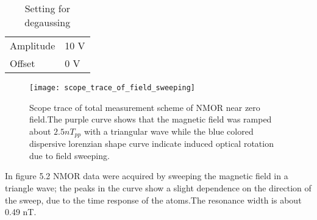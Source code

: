 \documentclass[12pt]{report}
\begin{document}
\begin{itemize}
\begin{table}[h]
\begin{tabular}{|l |l|}
Amplitude   &  10 V \\
Offset  &       0 V  \\
\hline
\end{tabular}
\caption{Setting for degaussing }
\end{table}
     \begin{figure}[h]
 \centering\texttt{[image: scope\_trace\_of\_field\_sweeping]}
\caption{Scope trace of total measurement scheme of NMOR near zero field.The purple curve shows that the magnetic field was ramped about $ 2.5 nT_{pp}$ with a triangular wave while the blue colored dispersive lorenzian shape curve indicate induced optical rotation due to field sweeping. }
\end{figure}
\newpage
In figure 5.2 NMOR data were acquired by sweeping the magnetic field in a triangle wave; the peaks in the curve show a slight dependence on the direction of the sweep, due to the time response of the atoms.The resonance width is about 0.49 nT.


\end{itemize}
\end{document}
